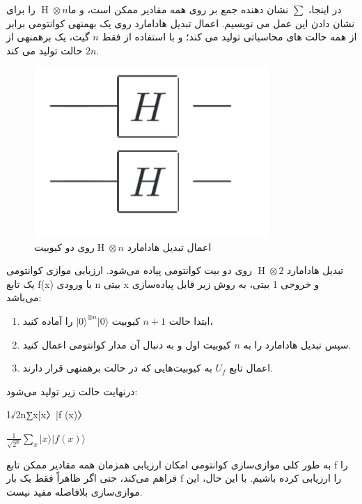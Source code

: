 \documentclass{book}
\begin{document}
در اینجا، $\sum$ نشان دهنده جمع بر روی همه مقادیر ممکن  است، و ما$\operatorname{H} \otimes n$  را برای نشان دادن این عمل می نویسیم.
اعمال تبدیل هادامارد روی یک بهمنهی کوانتومی برابر از همه حالت های محاسباتی تولید می کند؛ و با استفاده از فقط $n$ گیت، یک برهمنهی از $2n$ حالت تولید می کند.
\begin{center}
	\begin{figure}[ht]
		\centering
		\includegraphics[width=0.8\textwidth]{Multyhadamard.png}
		\caption{اعمال تبدیل هادامارد $\operatorname{H} \otimes n$روی دو کیوبیت}
	\end{figure}
\end{center}

تبدیل هادامارد $\operatorname{H} \otimes 2$ روی دو بیت کوانتومی پیاده می‌شود. ارزیابی موازی کوانتومی یک تابع f(x) با ورودی n بیتی x و خروجی 1 بیتی، به روش زیر قابل پیاده‌سازی می‌باشد:

\begin{enumerate}
	\item ابتدا حالت $n + 1$ کیوبیت $\vert0\rangle^{\otimes n} \vert 0\rangle$ را آماده کنید،
	\item سپس تبدیل هادامارد را به $n$ کیوبیت اول و به دنبال آن مدار کوانتومی اعمال کنید.
	\item اعمال تابع $U_{f}$ به کیوبیت‌هایی که در حالت برهمنهی قرار دارند.
\end{enumerate}
درنهایت حالت زیر تولید ‌می‌شود:

1√2n∑x|x〉|f (x)〉

\begin{center}
	$\frac{1}{\sqrt{2^n}} \sum_{x} \vert x \rangle \vert f (x)\rangle$ 
\end{center}


به طور کلی موازی‌سازی کوانتومی امکان ارزیابی همزمان همه مقادیر ممکن تابع f را فراهم می‌کند، حتی اگر ظاهراً فقط یک بار f را ارزیابی کرده باشیم. با این حال، این موازی‌سازی بلافاصله مفید نیست. 
\end{document}
